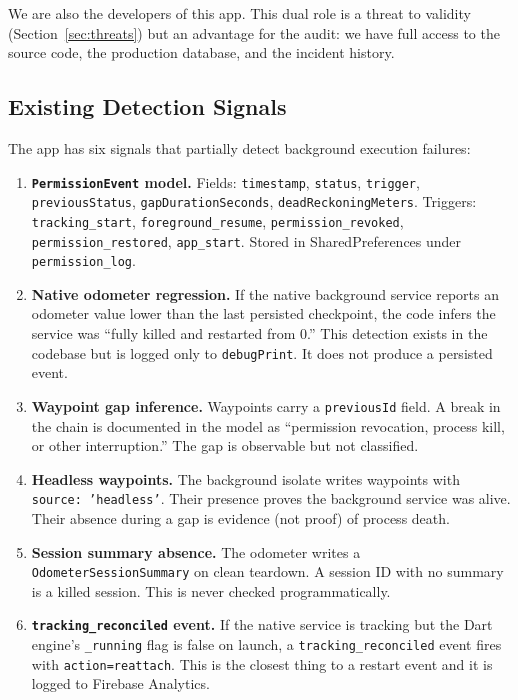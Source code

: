 \documentclass[10pt,journal,compsoc]{IEEEtran}
\begin{document}
We are also the developers of this app. This dual role is a threat to
validity (Section~\ref{sec:threats}) but an advantage for the audit: we
have full access to the source code, the production database, and the
incident history.

\subsection{Existing Detection Signals}

The app has six signals that partially detect background execution
failures:

\begin{enumerate}[nosep]
  \item \textbf{\texttt{PermissionEvent} model.} Fields:
        \texttt{timestamp}, \texttt{status}, \texttt{trigger},
        \texttt{previousStatus}, \texttt{gapDurationSeconds},
        \texttt{deadReckoningMeters}. Triggers:
        \texttt{tracking\_start}, \texttt{foreground\_resume},
        \texttt{permission\_revoked}, \texttt{permission\_restored},
        \texttt{app\_start}. Stored in SharedPreferences under
        \texttt{permission\_log}.

  \item \textbf{Native odometer regression.} If the native background
        service reports an odometer value lower than the last
        persisted checkpoint, the code infers the service was ``fully
        killed and restarted from 0.'' This detection exists in the
        codebase but is logged only to \texttt{debugPrint}. It does
        not produce a persisted event.

  \item \textbf{Waypoint gap inference.} Waypoints carry a
        \texttt{previousId} field. A break in the chain is documented
        in the model as ``permission revocation, process kill, or other
        interruption.'' The gap is observable but not classified.

  \item \textbf{Headless waypoints.} The background isolate writes
        waypoints with \texttt{source: 'headless'}. Their presence
        proves the background service was alive. Their absence during
        a gap is evidence (not proof) of process death.

  \item \textbf{Session summary absence.} The odometer writes a
        \texttt{OdometerSessionSummary} on clean teardown. A session ID
        with no summary is a killed session. This is never checked
        programmatically.

  \item \textbf{\texttt{tracking\_reconciled} event.} If the native
        service is tracking but the Dart engine's \texttt{\_running}
        flag is false on launch, a \texttt{tracking\_reconciled} event
        fires with \texttt{action=reattach}. This is the closest thing
        to a restart event and it is logged to Firebase Analytics.
\end{enumerate}
\end{document}
